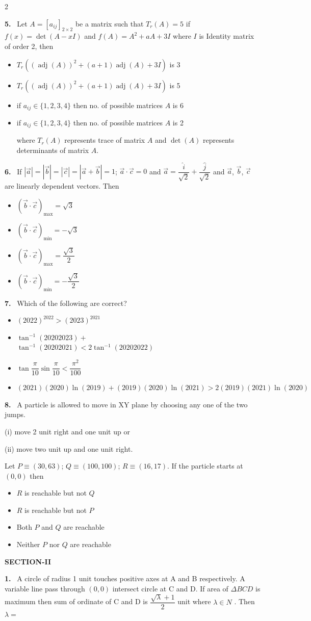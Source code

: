\documentclass[10pt]{extarticle}
\newcommand{\sect}[1]{\par\smallskip\noindent\textbf{#1}\par}
\newcommand{\qn}[1]{\par\smallskip\noindent\textbf{#1.}~}
\newenvironment{qoptions}{\begin{itemize}[leftmargin=1.8em,itemsep=1pt,topsep=2pt,label={}]}{\end{itemize}}
\newcommand{\opt}[2]{\item[(#1)] #2}
\begin{document}
\begin{multicols}{2}
\qn{5} Let $A=[a_{ij}]_{2\times2}$ be a matrix such that $T_r(A)=5$ if $f(x)=\det(A-xI)$ and $f(A)=A^2+aA+3I$ where $I$ is Identity matrix of order 2, then
\begin{qoptions}
\opt{A}{$T_r\left(\left(\operatorname{adj}(A)\right)^2+(a+1)\operatorname{adj}(A)+3I\right)$ is 3}
\opt{B}{$T_r\left(\left(\operatorname{adj}(A)\right)^2+(a+1)\operatorname{adj}(A)+3I\right)$ is 5}
\opt{C}{if $a_{ij}\in\{1,2,3,4\}$ then no. of possible matrices $A$ is 6}
\opt{D}{if $a_{ij}\in\{1,2,3,4\}$ then no. of possible matrices $A$ is 2

where $T_r(A)$ represents trace of matrix $A$ and $\det(A)$ represents determinants of matrix $A$.}
\end{qoptions}

\qn{6} If $|\vec a|=|\vec b|=|\vec c|=|\vec a+\vec b|=1$; $\vec a\cdot\vec c=0$ and $\vec a=\dfrac{\hat i}{\sqrt2}+\dfrac{\hat j}{\sqrt2}$ and $\vec a$, $\vec b$, $\vec c$ are linearly dependent vectors. Then
\begin{qoptions}
\opt{A}{$(\vec b\cdot\vec c)_{\max}=\sqrt3$}
\opt{B}{$(\vec b\cdot\vec c)_{\min}=-\sqrt3$}
\opt{C}{$(\vec b\cdot\vec c)_{\max}=\dfrac{\sqrt3}{2}$}
\opt{D}{$(\vec b\cdot\vec c)_{\min}=-\dfrac{\sqrt3}{2}$}
\end{qoptions}

\qn{7} Which of the following are correct?
\begin{qoptions}
\opt{A}{$(2022)^{2022}>(2023)^{2021}$}
\opt{B}{$\tan^{-1}(20202023)+$\\$\tan^{-1}(20202021)<2\tan^{-1}(20202022)$}
\opt{C}{$\tan\dfrac{\pi}{10}\sin\dfrac{\pi}{10}<\dfrac{\pi^2}{100}$}
\opt{D}{$(2021)(2020)\ln(2019)+(2019)(2020)\ln(2021)>2(2019)(2021)\ln(2020)$}
\end{qoptions}

\qn{8} A particle is allowed to move in XY plane by choosing any one of the two jumps.

(i) move 2 unit right and one unit up or

(ii) move two unit up and one unit right.

Let $P\equiv(30,63)$; $Q\equiv(100,100)$; $R\equiv(16,17)$. If the particle starts at $(0,0)$ then
\begin{qoptions}
\opt{A}{$R$ is reachable but not $Q$}
\opt{B}{$R$ is reachable but not $P$}
\opt{C}{Both $P$ and $Q$ are reachable}
\opt{D}{Neither $P$ nor $Q$ are reachable}
\end{qoptions}

\sect{SECTION-II}
\qn{1} A circle of radius 1 unit touches positive axes at A and B respectively. A variable line pass through $(0,0)$ intersect circle at C and D. If area of $\Delta BCD$ is maximum then sum of ordinate of C and D is $\dfrac{\sqrt\lambda+1}{2}$ unit where $\lambda\in N$ . Then $\lambda=$


\end{multicols}
\end{document}
